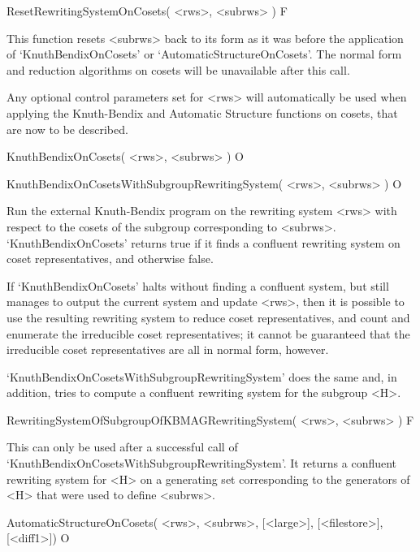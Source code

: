 \>ResetRewritingSystemOnCosets( <rws>, <subrws> ) F

This function resets <subrws> back to its form as it
was before the application of `KnuthBendixOnCosets' or
`AutomaticStructureOnCosets'.
The normal form and  reduction algorithms on cosets will  be
unavailable after  this call.

Any optional control parameters set for <rws> will automatically be used when
applying the Knuth-Bendix and Automatic Structure functions on cosets,
that are now to be described.



\>KnuthBendixOnCosets( <rws>, <subrws> ) O

\>KnuthBendixOnCosetsWithSubgroupRewritingSystem( <rws>, <subrws> ) O

Run the external Knuth-Bendix program  on the rewriting system  <rws>
with respect to the cosets of the subgroup corresponding to <subrws>.
`KnuthBendixOnCosets'  returns  true  if it  finds   a  confluent rewriting
system  on coset representatives, and otherwise false.

If `KnuthBendixOnCosets' halts without finding a confluent system, but still
manages to output the current system and update <rws>, then it is possible to
use the  resulting   rewriting system  to  reduce  coset representatives,  and  
count  and enumerate   the irreducible coset representatives;
it  cannot   be guaranteed that the
irreducible coset representatives are all in normal form, however.

`KnuthBendixOnCosetsWithSubgroupRewritingSystem' does the same and, in
addition, tries to compute a confluent rewriting system for the subgroup <H>.

\>RewritingSystemOfSubgroupOfKBMAGRewritingSystem( <rws>, <subrws> ) F

This can only be used after a successful call of
`KnuthBendixOnCosetsWithSubgroupRewritingSystem'.
It returns a confluent rewriting system for <H> on a generating set
corresponding to the generators of <H> that were used to define <subrws>.



\>AutomaticStructureOnCosets(
                <rws>, <subrws>, [<large>], [<filestore>], [<diff1>]) O

